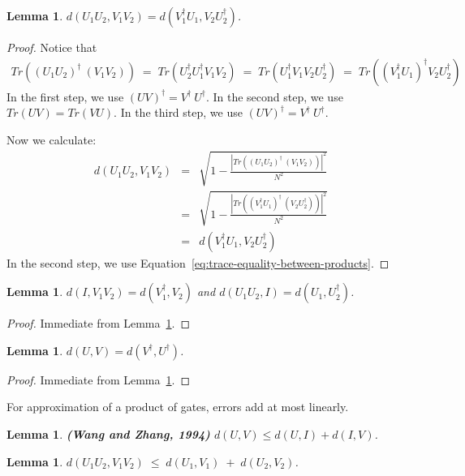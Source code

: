 \documentclass[11pt]{article}
\def\({\begin{eqnarray*}}
\def\){\end{eqnarray*}}
\newtheorem{lemma}[theorem]{Lemma}
\begin{document}
\begin{lemma}
$d(U_1 U_2, V_1 V_2) = d(V_1^\dag U_1, V_2 U_2^\dag)$.
\label{lem:distance-equality-for-products}
\end{lemma}

\begin{proof}
Notice that
\begin{eqnarray}
Tr((U_1 U_2)^\dag\ (V_1 V_2)) 
\;=\;
Tr(U_2^\dag U_1^\dag V_1 V_2) 
\;=\;
Tr(U_1^\dag V_1 V_2 U_2^\dag)
\;=\;
Tr((V_1^\dag U_1)^\dag V_2 U_2^\dag)
\label{eq:trace-equality-between-products}
\end{eqnarray}
In the first step, we use $(UV)^\dag = V^\dag\ U^\dag$.
In the second step, we use $Tr(UV) = Tr(VU)$.
In the third step, we use $(UV)^\dag = V^\dag\ U^\dag$.

Now we calculate:
\(
d(U_1 U_2, V_1 V_2) &=&
\sqrt{ 1 - \frac{ | Tr( (U_1 U_2)^\dag\ (V_1 V_2) ) |^2 }{ N^2 } }
\\ &=&
\sqrt{ 1 - \frac{ | Tr( (V_1^\dag U_1)^\dag\ (V_2 U_2^\dag) ) |^2 }{ N^2 } }
\\ &=&
d(V_1^\dag U_1, V_2 U_2^\dag)
\)
In the second step, we use Equation~\ref{eq:trace-equality-between-products}.
\end{proof}

\begin{lemma}
$d(I, V_1 V_2) = d(V_1^\dag, V_2)$ and
$d(U_1 U_2, I) = d(U_1, U_2^\dag)$.
\label{lem:distance-to-identity}
\end{lemma}

\begin{proof}
Immediate from Lemma~\ref{lem:distance-equality-for-products}.
\end{proof}

\begin{lemma}
$d(U,V) = d(V^\dag, U^\dag)$.
\label{lem:distance-of-conjugated-unitaries}
\end{lemma}

\begin{proof}
Immediate from Lemma~\ref{lem:distance-equality-for-products}.
\end{proof}

For approximation of a product of gates, errors add at most linearly.

\begin{lemma} {\bf (Wang and Zhang, 1994)}
$d(U,V) \leq d(U,I) + d(I,V)$.
\label{lem:trace-inequality}
\end{lemma}

\begin{lemma}
$d(U_1 U_2, V_1 V_2) \;\leq\; d(U_1, V_1) \;+\; d(U_2, V_2)$.
\label{lem:hs-small-product-rule}
\end{lemma}
\end{document}
